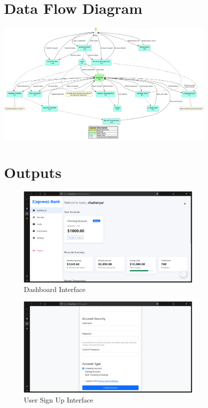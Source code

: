 \documentclass[12pt,a4paper]{report}
\begin{document}
\chapter{Data Flow Diagram}

\includegraphics[width=0.8\textwidth, height=0.7\textheight, angle=90]{dataflow.png}

\chapter{Outputs}

\begin{figure}[h]
    \centering
    \includegraphics[width=0.8\textwidth]{dashboard.png}
    \caption{Dashboard Interface}
\end{figure}

\begin{figure}[h]
    \centering
    \includegraphics[width=0.8\textwidth]{register.png}
    \caption{User Sign Up Interface}
\end{figure}
\end{document}
